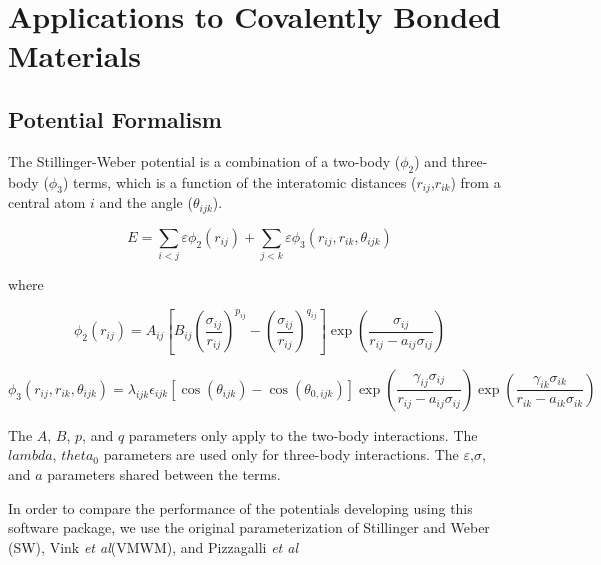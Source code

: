 \chapter{Applications to Covalently Bonded Materials}\label{chapter:pareto_Si}

\section{Potential Formalism}
The Stillinger-Weber potential\cite{stillinger1985_sw} is a combination of a two-body ($\phi_2$) and three-body ($\phi_3$) terms, which is a function of the interatomic distances ($r_{ij}$,$r_{ik}$) from a central atom $i$ and the angle ($\theta_{ijk}$).

\begin{equation}
    E = \sum_{i<j}\varepsilon \phi_2 (r_{ij})
        +\sum_{j<k}\varepsilon \phi_3 (r_{ij},r_{ik},\theta_{ijk})
\end{equation}

where

\begin{equation}
    \phi_2(r_{ij})=A_{ij} \left[
        B_{ij}
        \left(\frac{\sigma_{ij}}{r_{ij}}\right)^{p_{ij}}
        - \left(\frac{\sigma_{ij}}{r_{ij}}\right)^{q_{ij}}
    \right]
    \exp\left(\frac{\sigma_{ij}}{r_{ij}-a_{ij}\sigma_{ij}}\right)
\end{equation}

\begin{equation}
    \phi_3(r_{ij},r_{ik},\theta_{ijk}) =
        \lambda_{ijk}
        \epsilon_{ijk}
        \left[
            \cos(\theta_{ijk}) - \cos(\theta_{0,ijk})
        \right]
        \exp\left(\frac{\gamma_{ij}\sigma_{ij}}
                       {r_{ij}-a_{ij}\sigma_{ij}}
            \right)
        \exp\left(\frac{\gamma_{ik}\sigma_{ik}}
                       {r_{ik}-a_{ik}\sigma_{ik}}
            \right)
\end{equation}

The $A$, $B$, $p$, and $q$ parameters only apply to the two-body interactions.
The $lambda$, $theta_0$ parameters are used only for three-body interactions.
The $\varepsilon$,$\sigma$, and $a$ parameters shared between the terms.

In order to compare the performance of the potentials developing using this software package, we use the original parameterization of Stillinger and Weber (SW)\cite{stillinger1985_sw}, Vink \emph{et al}(VMWM)\cite{vink2001_sw_Si}, and Pizzagalli \emph{et al}\cite{pizzagalli2013_sw_Si}

